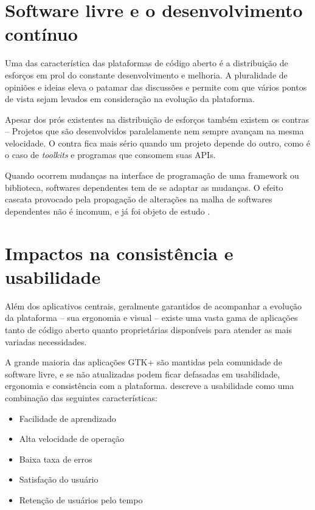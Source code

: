 \section{Software livre e o desenvolvimento contínuo}

Uma das característica das plataformas de código aberto é a distribuição de
esforços em prol do constante desenvolvimento e melhoria. A pluralidade de
opiniões e ideias eleva o patamar das discussões e permite com que vários pontos
de vista sejam levados em consideração na evolução da plataforma.

Apesar dos prós existentes na distribuição de esforços também existem os contras
-- Projetos que são desenvolvidos paralelamente nem sempre avançam na mesma
velocidade. O contra fica mais sério quando um projeto depende do outro, como é
o caso de \textit{toolkits} e programas que consomem suas APIs.

Quando ocorrem mudanças na interface de programação de uma framework ou
biblioteca, softwares dependentes tem de se adaptar as mudanças. O efeito
cascata provocado pela propagação de alterações na malha de softwares
dependentes não é incomum, e já foi objeto de estudo \cite{yau1978ripple}.

\section{Impactos na consistência e usabilidade}

Além dos aplicativos centrais, geralmente garantidos de acompanhar a evolução
da plataforma -- sua ergonomia e visual -- existe uma vasta gama de aplicações
tanto de código aberto quanto proprietárias disponíveis para atender as mais
variadas necessidades.

A grande maioria das aplicações GTK+ são mantidas pela comunidade de software
livre, e se não atualizadas podem ficar defasadas em usabilidade, ergonomia e
consistência com a plataforma.  descreve
a usabilidade como uma combinação das seguintes características:

\begin{itemize}
    \item Facilidade de aprendizado
    \item Alta velocidade de operação
    \item Baixa taxa de erros
    \item Satisfação do usuário
    \item Retenção de usuários pelo tempo
\end{itemize}

